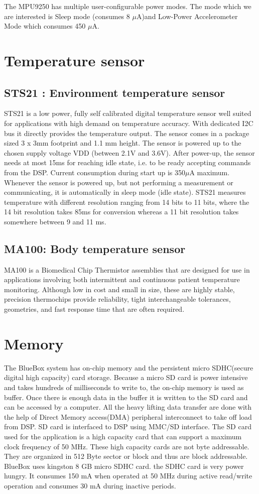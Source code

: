 The MPU9250 has multiple user-configurable power modes. The mode which we are interested is Sleep mode (consumes 8 $\mu$A)and Low-Power Accelerometer Mode which consumes 450 $\mu$A. 
 
\section{Temperature sensor}
\subsection{ STS21 : Environment temperature sensor}
STS21 is a low power, fully self calibrated digital temperature sensor well suited for applications with high demand on temperature accuracy. With dedicated I2C bus it directly provides the temperature output. The sensor comes in a package sized 3 x 3mm footprint and 1.1 mm height. The sensor is powered up to the chosen supply voltage VDD (between 2.1V and 3.6V). After power-up, the sensor needs at most 15ms for reaching idle state, i.e. to be ready accepting commands from the DSP. Current consumption during start up is 350$\mu$A maximum. Whenever the sensor is powered up, but not performing a measurement or communicating, it is automatically in sleep mode (idle state). STS21 measures temperature with different resolution ranging from 14 bits to 11 bits, where the 14 bit resolution takes 85ms for conversion whereas a 11 bit resolution takes somewhere between 9 and 11 ms.

\subsection{MA100: Body temperature sensor} 
MA100 is a Biomedical Chip Thermistor assemblies that are designed for use in applications involving both intermittent and continuous patient temperature monitoring. Although low in cost and small in size, these are highly stable, precision thermochips provide reliability, tight interchangeable tolerances, geometries, and fast response time that are often required.
 
\section{Memory}\label{memory}
The BlueBox system has on-chip memory and the persistent micro SDHC(secure digital high capacity) card storage. Because a micro SD card is power intensive and takes hundreds of milliseconds to write to, the on-chip memory is used as buffer. Once there is enough data in the buffer it is written to the SD card and can be accessed by a computer. All the heavy lifting data transfer are done with the help of Direct Memory access(DMA) peripheral interconnect to take off load from DSP. SD card is interfaced to DSP using MMC/SD interface. The SD card used for the application is a high capacity card that can support a maximum clock frequency of 50 MHz. These high capacity cards are not byte addressable. They are organized in 512 Byte sector or block and thus are block addressable. BlueBox uses kingston 8 GB micro SDHC card. the SDHC card is very power hungry. It consumes 150 mA when operated at 50 MHz during active read/write operation and consumes 30 mA during inactive periods.

